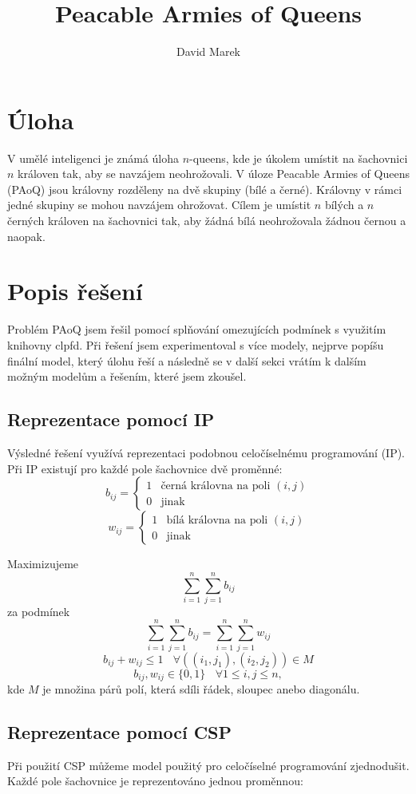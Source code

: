 \documentclass[11pt]{article}
\title{Peacable Armies of Queens}
\author{David Marek}
\date{}
\begin{document}
\maketitle

\section{Úloha}
V umělé inteligenci je známá úloha $n$-queens, kde je úkolem umístit na
šachovnici $n$ královen tak, aby se navzájem neohrožovali. V úloze Peacable
Armies of Queens (PAoQ) jsou královny rozděleny na dvě skupiny (bílé a černé).
Královny v rámci jedné skupiny se mohou navzájem ohrožovat. Cílem je umístit
$n$ bílých a $n$ černých královen na šachovnici tak, aby žádná bílá
neohrožovala žádnou černou a naopak.

\section{Popis řešení}
Problém PAoQ jsem řešil pomocí splňování omezujících podmínek s využitím
knihovny clpfd. Při řešení jsem experimentoval s více modely, nejprve popíšu
finální model, který úlohu řeší a následně se v další sekci vrátím k dalším
možným modelům a řešením, které jsem zkoušel.

\subsection{Reprezentace pomocí IP}
Výsledné řešení využívá reprezentaci podobnou celočíselnému programování (IP).
Při IP existují pro každé pole šachovnice dvě proměnné:
\[
    b_{ij} = \begin{cases}
        1 & \text{černá královna na poli $(i,j)$} \\
        0 & \text{jinak}
    \end{cases}
\]
\[
    w_{ij} = \begin{cases}
        1 & \text{bílá královna na poli $(i,j)$} \\
        0 & \text{jinak}
    \end{cases}
\]

Maximizujeme 
$$\sum_{i=1}^n\sum_{j=1}^n b_{ij}$$
za podmínek
$$\sum_{i=1}^n\sum_{j=1}^n b_{ij} = \sum_{i=1}^n\sum_{j=1}^n w_{ij}$$
$$b_{ij} + w_{ij} \le 1 ~~~~ \forall ((i_1, j_1), (i_2, j_2)) \in M$$
$$b_{ij}, w_{ij} \in \{0, 1\} ~~~~ \forall 1 \le i, j \le n,$$
kde $M$ je množina párů polí, která sdíli řádek, sloupec anebo diagonálu.

\subsection{Reprezentace pomocí CSP}
Při použití CSP můžeme model použitý pro celočíselné programování zjednodušit.
Každé pole šachovnice je reprezentováno jednou proměnnou:
\end{document}
